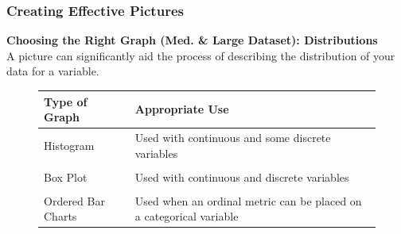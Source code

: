 \documentclass{beamer}
\begin{document}
\begin{frame}
\frametitle{Creating Effective Pictures}
\textbf{Choosing the Right Graph (Med. \& Large Dataset): Distributions}\\
\vspace{0.2cm}
A picture can significantly aid the process of describing the distribution of your data for a variable.
\begin{figure}
\begin{tabular}{l p{6cm}}
\toprule
\textbf{Type of Graph} & \textbf{Appropriate Use}\\
\midrule
Histogram & Used with continuous and some discrete variables\\
 & \\
Box Plot & Used with continuous and discrete variables\\
 & \\
Ordered Bar Charts & Used when an ordinal metric can be placed on a categorical variable\\
\bottomrule
\end{tabular}
\end{figure}
\end{frame}

\end{document}
